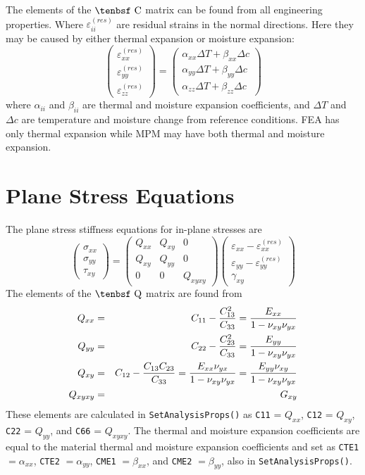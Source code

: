 \documentclass[11pt]{book}
\def\a#1{\alpha_{#1}}
\def\b#1{\beta_{#1}}
\def\C{\hbox{\tenbsf C}}
\def\code#1{{\small\tt #1}}
\def\DT{\Delta T}
\def\e#1{\varepsilon_{#1}}
\def\er#1{\varepsilon_{#1}^{(res)}}
\def\g#1{\gamma_{#1}}
\def\Q{\hbox{\tenbsf Q}}
\def\s#1{\sigma_{#1}}
\def\symmat#1#2#3#4#5#6{\left(\begin{array}{ccc} #1 & #2 & #3 \\ #2 & #4 & #5 \\
                                                      #3 & #5 & #6 \end{array}\right)}
\def\t#1{\tau_{#1}}
\def\v#1{\nu_{#1}}
\def\vvec#1#2#3{\left(\begin{array}{ccc} #1 \\ #2 \\ #3 \end{array}\right)}
\begin{document}
The elements of the $\C$ matrix can be found from all engineering properties. Where $\er{ii}$ are  residual strains in the normal directions. Here they may be caused by either thermal expansion or moisture expansion:
\begin{equation}
\left(\begin{array}{c} \er{xx} \\ \er{yy} \\ \er{zz} \end{array}\right)
       =  \left(\begin{array}{c}
	\a{xx}\DT + \b{xx}\Delta c \\
	\a{yy}\DT + \b{yy}\Delta c \\
	\a{zz}\DT + \b{zz}\Delta c  \end{array}\right)
\end{equation}
where $\a{ii}$ and $\b{ii}$ are thermal and moisture expansion coefficients, and $\DT$ and $\Delta c$ are temperature and moisture change from reference conditions. FEA has only thermal expansion while MPM may have both thermal and moisture expansion.

\section{Plane Stress Equations}

The plane stress stiffness equations for in-plane stresses are
\begin{equation}
      \vvec{\s{xx}}{\s{yy}}{\t{xy}} = \symmat{Q_{xx}}{Q_{xy}}{0}{Q_{yy}}{0}{Q_{xyxy}}
          \vvec{\e{xx} - \er{xx}}{\e{yy} - \er{yy}}{\g{xy}}
 \end{equation}
The elements of the $\Q$ matrix are found from
\begin{eqnarray}%
   Q_{xx} &  = &  C_{11} - {C_{13}^2\over C_{33}} = {E_{xx}\over 1 - \v{xy}\v{yx}} \\
   Q_{yy} & = & C_{22} - {C_{23}^2\over C_{33}} = {E_{yy}\over 1 - \v{xy}\v{yx}} \\
   Q_{xy} &  = & C_{12} - {C_{13}C_{23}\over C_{33}} = {E_{xx}\v{yx}\over 1 - \v{xy}\v{yx}}  =  {E_{yy}\v{xy}\over 1 - \v{xy}\v{yx}}\\
   Q_{xyxy} & = &  G_{xy} 
\end{eqnarray}%
These elements are calculated in \code{SetAnalysisProps()} as \code{C11} = $Q_{xx}$, \code{C12} = $Q_{xy}$, \code{C22} = $Q_{yy}$, and \code{C66} = $Q_{xyxy}$. The thermal  and moisture expansion coefficients are equal to the material thermal  and moisture expansion coefficients and set as \code{CTE1} $=\a{xx}$, \code{CTE2} $=\a{yy}$, \code{CME1} $=\b{xx}$, and \code{CME2} $=\b{yy}$, also in \code{SetAnalysisProps()}.
\end{document}
